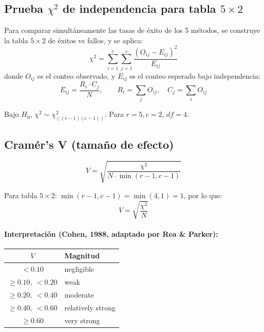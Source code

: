 \documentclass[12pt,a4paper,oneside]{book}
\begin{document}
\subsection{Prueba $\chi^2$ de independencia para tabla $5\times 2$}

Para comparar simultáneamente las tasas de éxito de los 5 métodos, se construye la tabla $5\times 2$ de éxitos vs fallos, y se aplica:
\begin{equation}
\boxed{\chi^2 = \sum_{i=1}^{r}\sum_{j=1}^{c} \frac{(O_{ij} - E_{ij})^2}{E_{ij}}}
\end{equation}
donde $O_{ij}$ es el conteo observado, y $E_{ij}$ es el conteo esperado bajo independencia:
\begin{equation}
E_{ij} = \frac{R_i \cdot C_j}{N}, \qquad R_i = \sum_j O_{ij}, \quad C_j = \sum_i O_{ij}
\end{equation}

Bajo $H_0$, $\chi^2 \sim \chi^2_{((r-1)(c-1))}$. Para $r=5, c=2$, $df = 4$.

\subsection{Cramér's V (tamaño de efecto)}

\begin{equation}
\boxed{V = \sqrt{\frac{\chi^2}{N \cdot \min(r-1, c-1)}}}
\end{equation}

Para tabla $5\times 2$: $\min(r-1, c-1) = \min(4, 1) = 1$, por lo que:
\begin{equation}
V = \sqrt{\frac{\chi^2}{N}}
\end{equation}

\paragraph{Interpretación (Cohen, 1988, adaptado por Rea \& Parker):}
\begin{table}[H]
\centering
\begin{tabular}{cl}
\toprule
$V$ & Magnitud \\
\midrule
$< 0.10$ & negligible \\
$\geq 0.10,\ <0.20$ & weak \\
$\geq 0.20,\ <0.40$ & moderate \\
$\geq 0.40,\ <0.60$ & relatively strong \\
$\geq 0.60$ & very strong \\
\bottomrule
\end{tabular}
\end{table}
\end{document}
